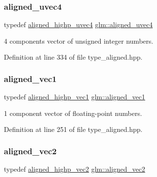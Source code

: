 \subsubsection{\texorpdfstring{aligned\_uvec4}{aligned\_uvec4}}
{\footnotesize\ttfamily typedef \mbox{\hyperlink{group__gtc__type__aligned_ga15c8f3d51b9df35dbf8bf2276512588b}{aligned\+\_\+highp\+\_\+uvec4}} \mbox{\hyperlink{group__gtc__type__aligned_ga1e0792f3c64836e042ee3aad9bd8209c}{glm\+::aligned\+\_\+uvec4}}}



4 components vector of unsigned integer numbers. 



Definition at line 334 of file type\+\_\+aligned.\+hpp.

\mbox{\label{group__gtc__type__aligned_ga8cf75c112dfa39264b7ef65c2ed6b3c4}} 
\subsubsection{\texorpdfstring{aligned\_vec1}{aligned\_vec1}}
{\footnotesize\ttfamily typedef \mbox{\hyperlink{group__gtc__type__aligned_ga5d83af334bd222c85f73bf37eecf4768}{aligned\+\_\+highp\+\_\+vec1}} \mbox{\hyperlink{group__gtc__type__aligned_ga8cf75c112dfa39264b7ef65c2ed6b3c4}{glm\+::aligned\+\_\+vec1}}}



1 component vector of floating-\/point numbers. 



Definition at line 251 of file type\+\_\+aligned.\+hpp.

\mbox{\label{group__gtc__type__aligned_ga8f4a38f220c72d218dbdc7bc1d06a1a2}} 
\subsubsection{\texorpdfstring{aligned\_vec2}{aligned\_vec2}}
{\footnotesize\ttfamily typedef \mbox{\hyperlink{group__gtc__type__aligned_ga5873b18cca2602c92bb077e663e29bbd}{aligned\+\_\+highp\+\_\+vec2}} \mbox{\hyperlink{group__gtc__type__aligned_ga8f4a38f220c72d218dbdc7bc1d06a1a2}{glm\+::aligned\+\_\+vec2}}}



